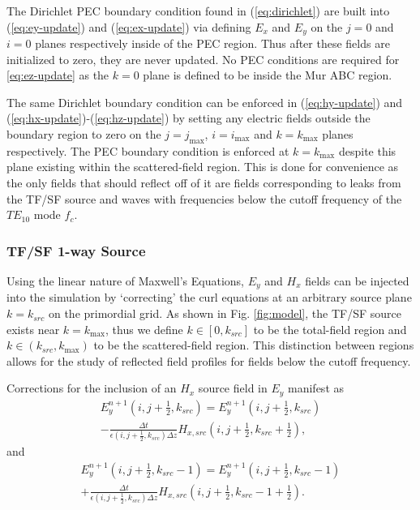 The Dirichlet PEC boundary condition found in  (\ref{eq:dirichlet}) are built into  (\ref{eq:ey-update}) and (\ref{eq:ex-update}) via defining $E_x$ and $E_y$ on the $j=0$ and $i=0$ planes respectively inside of the PEC region. Thus after these fields are initialized to zero, they are never updated. No PEC conditions are required for  \ref{eq:ez-update} as the $k=0$ plane is defined to be inside the Mur ABC region.

The same Dirichlet boundary condition can be enforced in  (\ref{eq:hy-update}) and (\ref{eq:hx-update})-(\ref{eq:hz-update}) by setting any electric fields outside the boundary region to zero on the $j=j_{\max}$, $i=i_{\max}$ and $k=k_{\max}$ planes respectively. The PEC boundary condition is enforced at $k=k_{\max}$ despite this plane existing within the scattered-field region. This is done for convenience as the only fields that should reflect off of it are fields corresponding to leaks from the TF/SF source and waves with frequencies below the cutoff frequency of the $TE_{10}$ mode $f_c$.

\subsubsection{TF/SF 1-way Source}
\label{subsubsec:tfsf-timestep}
Using the linear nature of Maxwell's Equations, $E_y$ and $H_x$ fields can be injected into the simulation by `correcting' the curl equations at an arbitrary source plane $k=k_{src}$ on the primordial grid. As shown in Fig. \ref{fig:model}, the TF/SF source exists near $k=k_{\max}$, thus we define $k\in[0,k_{src}]$ to be the total-field region and $k\in(k_{src},k_{\max})$ to be the scattered-field region. This distinction between regions allows for the study of reflected field profiles for fields below the cutoff frequency.

Corrections for the inclusion of an $H_x$ source field in $E_y$ manifest as
\begin{multline}
	E_y^{n+1}(i,j+\tfrac{1}{2},k_{src}) = E_y^{n+1}(i,j+\tfrac{1}{2},k_{src}) \\ - \frac{\Delta t}{\epsilon(i,j+\tfrac{1}{2},k_{src})\Delta z}H_{x,src}(i,j+\tfrac{1}{2},k_{src}+\tfrac{1}{2}),
\end{multline}
and
\begin{multline}
	E_y^{n+1}(i,j+\tfrac{1}{2},k_{src}-1) = E_y^{n+1}(i,j+\tfrac{1}{2},k_{src}-1) \\ + \frac{\Delta t}{\epsilon(i,j+\tfrac{1}{2},k_{src})\Delta z}H_{x,src}(i,j+\tfrac{1}{2},k_{src}-1+\tfrac{1}{2}).
\end{multline}

